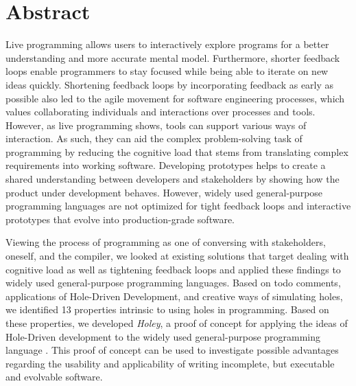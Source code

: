 \chapter{Abstract}
Live programming allows users to interactively explore programs for a better understanding and more accurate mental model.
Furthermore, shorter feedback loops enable programmers to stay focused while being able to iterate on new ideas quickly.
Shortening feedback loops by incorporating feedback as early as possible also led to the agile movement for software engineering processes, which values collaborating individuals and interactions over processes and tools.
However, as live programming shows, tools can support various ways of interaction.
As such, they can aid the complex problem-solving task of programming by reducing the cognitive load that stems from translating complex requirements into working software.
Developing prototypes helps to create a shared understanding between developers and stakeholders by showing how the product under development behaves.
However, widely used general-purpose programming languages are not optimized for tight feedback loops and interactive prototypes that evolve into production-grade software.

Viewing the process of programming as one of conversing with stakeholders, oneself, and the compiler, we looked at existing solutions that target dealing with cognitive load as well as tightening feedback loops and applied these findings to widely used general-purpose programming languages.
Based on todo comments, applications of Hole-Driven Development, and creative ways of simulating holes, we identified 13 properties intrinsic to using holes in programming.
Based on these properties, we developed \emph{Holey}, a proof of concept for applying the ideas of Hole-Driven development to the widely used general-purpose programming language \CS.
This proof of concept can be used to investigate possible advantages regarding the usability and applicability of writing incomplete, but executable and evolvable software.
